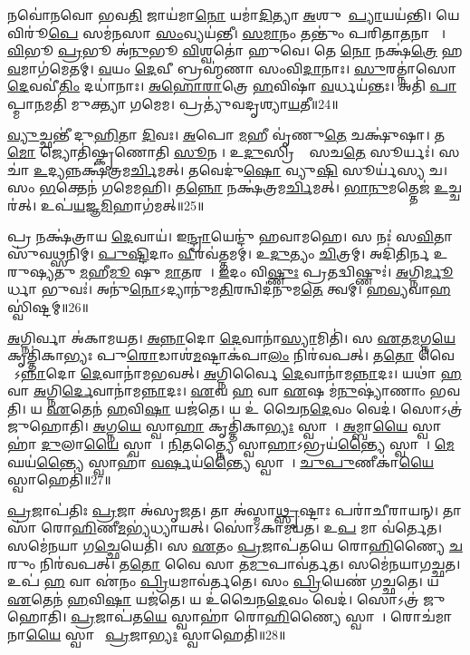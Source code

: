 𑌨𑌵𑍋॑𑌨𑌵𑍋 𑌭𑌵\ul{𑌤𑌿} 𑌜𑌾𑌯॑𑌮𑌾\ul{𑌨𑍋} 𑌯𑌮𑌾॑\ul{𑌦𑌿}𑌤𑍍𑌯𑌾 \ul{𑌅}\ul{}𑌶𑍁𑌮𑌾᳚\ul{𑌪𑍍𑌯𑌾}𑌯𑌯॑𑌨𑍍𑌤𑌿।
𑌯𑍇 𑌵𑌿𑌰𑍂॑\ul{𑌪𑍇} 𑌸𑌮॑𑌨𑌸𑌾 \ul{𑌸𑌂}𑌵𑍍𑌯𑌯॑𑌨𑍍𑌤𑍀।
\ul{𑌸}\ul{𑌮𑌾}𑌨𑌂 𑌤𑌨𑍍𑌤𑍁𑌂॑ 𑌪𑌰𑌿𑌤𑌾\ul{𑌤}𑌨𑌾 𑌤𑍇᳚।
\ul{𑌵𑌿}𑌭𑍂 \ul{𑌪𑍍𑌰}𑌭𑍂 𑌅॑\ul{𑌨𑍁}𑌭𑍂 \ul{𑌵𑌿}𑌶𑍍𑌵𑌤𑍋॑ 𑌹𑍁𑌵𑍇।
𑌤𑍇 \ul{𑌨𑍋} 𑌨𑌕𑍍𑌷॑\ul{𑌤𑍍𑌰𑍇} 𑌹\ul{𑌵}𑌮𑌾𑌗॑𑌮𑍇𑌤𑌮𑍍।
\ul{𑌵}𑌯𑌂 \ul{𑌦𑍇}𑌵𑍀 𑌬𑍍𑌰𑌹𑍍𑌮॑𑌣𑌾 𑌸𑌂𑌵𑌿\ul{𑌦𑌾}𑌨𑌾𑌃।
\ul{𑌸𑍁}𑌰𑌤𑍍𑌨𑌾॑𑌸𑍋 \ul{𑌦𑍇}𑌵𑌵𑍀॑\ul{𑌤𑌿𑌂} 𑌦𑌧𑌾॑𑌨𑌾𑌃।
\ul{𑌅}\ul{𑌹𑍋}\ul{𑌰𑌾}𑌤𑍍𑌰𑍇 \ul{𑌹}𑌵𑌿𑌷𑌾॑ \ul{𑌵}𑌰𑍍𑌧𑌯॑𑌨𑍍𑌤𑌃।
𑌅𑌤𑌿॑ \ul{𑌪𑌾}𑌪𑍍𑌮𑌾\ul{𑌨}𑌮𑌤𑌿॑ 𑌮𑍁𑌕𑍍𑌤𑍍𑌯𑌾 𑌗𑌮𑍇𑌮।
𑌪𑍍𑌰𑌤𑍍𑌯𑍁॑𑌵𑌦𑍃𑌶𑍍𑌯𑌾\ul{𑌯}𑌤𑍀॥24॥

\ul{𑌵𑍍𑌯𑍁}𑌚𑍍𑌛𑌨𑍍𑌤𑍀॑ 𑌦𑍁\ul{𑌹𑌿}𑌤𑌾 \ul{𑌦𑌿}𑌵𑌃।
\ul{𑌅}𑌪𑍋 \ul{𑌮}𑌹𑍀 𑌵𑍃॑𑌣𑍁\ul{𑌤𑍇} 𑌚𑌕𑍍𑌷𑍁॑𑌷𑌾।
𑌤\ul{𑌮𑍋} 𑌜𑍍𑌯𑍋𑌤𑌿॑𑌷𑍍𑌕𑍃𑌣𑍋𑌤𑌿 \ul{𑌸𑍂}𑌨𑌰𑍀᳚।
𑌉\ul{𑌦𑍁}𑌸𑍍𑌰𑌿𑌯𑌾𑌃᳚ 𑌸𑌚\ul{𑌤𑍇} 𑌸𑍂𑌰𑍍𑌯𑌃॑।
𑌸𑌚𑌾॑ \ul{𑌉}𑌦𑍍𑌯𑌨𑍍𑌨𑌕𑍍𑌷॑𑌤𑍍𑌰𑌮\ul{𑌰𑍍𑌚𑌿}𑌮𑌤𑍍।
𑌤𑌵𑍇𑌦𑍁॑\ul{𑌷𑍋} 𑌵𑍍𑌯𑍁\ul{𑌷𑌿} 𑌸𑍂𑌰𑍍𑌯॑𑌸𑍍𑌯 𑌚।
𑌸𑌂 \ul{𑌭}𑌕𑍍𑌤𑍇𑌨॑ 𑌗𑌮𑍇𑌮𑌹𑌿।
𑌤\ul{𑌨𑍍𑌨𑍋} 𑌨𑌕𑍍𑌷॑𑌤𑍍𑌰𑌮\ul{𑌰𑍍𑌚𑌿}𑌮𑌤𑍍।
\ul{𑌭𑌾}\ul{𑌨𑍁}𑌮𑌤𑍍𑌤𑍇𑌜॑ \ul{𑌉}𑌚𑍍𑌚𑌰॑𑌤𑍍।
𑌉𑌪॑\ul{𑌯}𑌜𑍍𑌞\ul{𑌮𑌿}𑌹𑌾𑌗॑𑌮𑌤𑍍॥25॥

𑌪𑍍𑌰 𑌨𑌕𑍍𑌷॑𑌤𑍍𑌰𑌾𑌯 \ul{𑌦𑍇}𑌵𑌾𑌯॑।
𑌇\ul{𑌨𑍍𑌦𑍍𑌰𑌾}𑌯𑍇𑌨𑍍𑌦𑍁॑ 𑌹𑌵𑌾𑌮𑌹𑍇।
𑌸 𑌨𑌃॑ 𑌸\ul{𑌵𑌿}𑌤𑌾 𑌸𑍁॑𑌵\ul{𑌥𑍍𑌸}𑌨𑌿𑌮𑍍।
\ul{𑌪𑍁}\ul{𑌷𑍍𑌟𑌿}𑌦𑌾𑌂 \ul{𑌵𑍀}𑌰𑌵॑𑌤𑍍𑌤𑌮𑌮𑍍।
𑌉\ul{𑌦𑍁}𑌤𑍍𑌯𑌂 \ul{𑌚𑌿}𑌤𑍍𑌰𑌮𑍍।
𑌅𑌦𑌿॑𑌤𑌿𑌰𑍍𑌨 𑌉𑌰𑍁𑌷𑍍𑌯𑌤𑍁 \ul{𑌮}𑌹𑍀\ul{𑌮𑍂} 𑌷𑍁 \ul{𑌮𑌾}𑌤𑌰𑌮𑍍᳚।
\ul{𑌇}𑌦𑌂 𑌵𑌿\ul{𑌷𑍍𑌣𑍁𑌃} 𑌪𑍍𑌰𑌤𑌦𑍍𑌵𑌿𑌷𑍍𑌣𑍁𑌃॑।
\ul{𑌅}𑌗𑍍𑌨𑌿\ul{𑌰𑍍𑌮𑍂}𑌰𑍍𑌧𑌾 𑌭𑍁𑌵𑌃॑।
𑌅𑌨𑍁॑\ul{𑌨𑍋}\-𑌽𑌦𑍍𑌯𑌾𑌨𑍁॑𑌮\ul{𑌤𑌿}𑌰𑌨𑍍𑌵𑌿𑌦॑𑌨𑍁𑌮\ul{𑌤𑍇} 𑌤𑍍𑌵𑌮𑍍।
\ul{𑌹}\ul{𑌵𑍍𑌯}𑌵𑌾\ul{𑌹}\ul{} 𑌸𑍍𑌵𑌿॑𑌷𑍍𑌟𑌮𑍍॥26॥\anuvakamend[\ul{𑌆}\ul{𑌯}𑌤𑍍𑌯॑𑌗\ul{𑌮}𑌥𑍍𑌸𑍍𑌵𑌿॑𑌷𑍍𑌟𑌮𑍍]

\ul{𑌅}𑌗𑍍𑌨𑌿𑌰𑍍𑌵𑌾 𑌅॑𑌕𑌾𑌮𑌯𑌤।
\ul{𑌅}\ul{𑌨𑍍𑌨𑌾}𑌦𑍋 \ul{𑌦𑍇}𑌵𑌾𑌨𑌾॑\ul{𑌸𑍍𑌯𑌾}𑌮𑌿𑌤𑌿॑।
𑌸 \ul{𑌏}𑌤\ul{𑌮}𑌗𑍍𑌨\ul{𑌯𑍇} 𑌕𑍃𑌤𑍍𑌤𑌿॑𑌕𑌾𑌭𑍍𑌯𑌃 𑌪𑍁\ul{𑌰𑍋}𑌡𑌾𑌶॑\ul{𑌮}𑌷𑍍𑌟𑌾𑌕॑𑌪𑌾\ul{𑌲𑌂} 𑌨𑌿𑌰॑𑌵𑌪𑌤𑍍।
𑌤\ul{𑌤𑍋} 𑌵𑍈 𑌸𑍋᳚\-𑌽\ul{𑌨𑍍𑌨𑌾}𑌦𑍋 \ul{𑌦𑍇}𑌵𑌾𑌨𑌾॑𑌮𑌭𑌵𑌤𑍍।
\ul{𑌅}𑌗𑍍𑌨𑌿𑌰𑍍𑌵𑍈 \ul{𑌦𑍇}𑌵𑌾𑌨𑌾॑𑌮\ul{𑌨𑍍𑌨𑌾}𑌦𑌃।
𑌯𑌥𑌾॑ \ul{𑌹} 𑌵𑌾 \ul{𑌅}𑌗𑍍𑌨𑌿\ul{𑌰𑍍𑌦𑍇}𑌵𑌾𑌨𑌾॑𑌮\ul{𑌨𑍍𑌨𑌾}𑌦𑌃।
\ul{𑌏}𑌵 \ul{𑌹} 𑌵𑌾 \ul{𑌏}𑌷 𑌮॑\ul{𑌨𑍁}𑌷𑍍𑌯𑌾॑𑌣𑌾𑌂 𑌭𑌵𑌤𑌿।
𑌯 \ul{𑌏}𑌤𑍇𑌨॑ \ul{𑌹}𑌵𑌿\ul{𑌷𑌾} 𑌯𑌜॑𑌤𑍇।
𑌯 𑌉॑ 𑌚𑍈𑌨\ul{𑌦𑍇}𑌵𑌂 𑌵𑍇𑌦॑।
𑌸𑍋𑌽𑌤𑍍𑌰॑ 𑌜𑍁𑌹𑍋𑌤𑌿।
\ul{𑌅}𑌗𑍍𑌨\ul{𑌯𑍇} 𑌸𑍍𑌵𑌾\ul{𑌹𑌾} 𑌕𑍃𑌤𑍍𑌤𑌿॑𑌕𑌾\ul{𑌭𑍍𑌯𑌃} 𑌸𑍍𑌵𑌾𑌹𑌾᳚।
\ul{𑌅}𑌮𑍍𑌬𑌾\ul{𑌯𑍈} 𑌸𑍍𑌵𑌾𑌹𑌾॑ \ul{𑌦𑍁}𑌲𑌾\ul{𑌯𑍈} 𑌸𑍍𑌵𑌾𑌹𑌾᳚।
\ul{𑌨𑌿}\ul{𑌤}𑌤𑍍𑌨𑍍𑌯𑍈 𑌸𑍍𑌵𑌾\ul{𑌹𑌾}\-𑌽𑌭𑍍𑌰𑌯॑\ul{𑌨𑍍𑌤𑍍𑌯𑍈} 𑌸𑍍𑌵𑌾𑌹𑌾᳚।
\ul{𑌮𑍇}𑌘𑌯॑\ul{𑌨𑍍𑌤𑍍𑌯𑍈} 𑌸𑍍𑌵𑌾𑌹𑌾॑ \ul{𑌵}\ul{𑌰𑍍}𑌷𑌯॑\ul{𑌨𑍍𑌤𑍍𑌯𑍈} 𑌸𑍍𑌵𑌾𑌹𑌾᳚।
\ul{𑌚𑍁}\ul{𑌪𑍁}𑌣𑍀𑌕𑌾॑\ul{𑌯𑍈} 𑌸𑍍𑌵𑌾𑌹𑍇𑌤𑌿॑॥27॥

\ul{𑌪𑍍𑌰}𑌜𑌾𑌪॑𑌤𑌿𑌃 \ul{𑌪𑍍𑌰}𑌜𑌾 𑌅॑𑌸𑍃𑌜𑌤।
𑌤𑌾 𑌅॑𑌸𑍍𑌮𑌾\ul{𑌥𑍍𑌸𑍃}𑌷𑍍𑌟𑌾𑌃 𑌪𑌰𑌾॑𑌚𑍀𑌰𑌾𑌯𑌨𑍍।
𑌤𑌾𑌸𑌾॑ 𑌰𑍋\ul{𑌹𑌿}𑌣𑍀\ul{𑌮}𑌭𑍍𑌯॑𑌧𑍍𑌯𑌾𑌯𑌤𑍍।
𑌸𑍋॑𑌽𑌕𑌾𑌮𑌯𑌤।
𑌉\ul{𑌪} 𑌮𑌾 𑌵॑𑌰𑍍𑌤𑍇𑌤।
𑌸𑌮𑍇॑𑌨𑌯𑌾 𑌗\ul{𑌚𑍍𑌛𑍇}𑌯𑍇𑌤𑌿॑।
𑌸 \ul{𑌏}𑌤𑌂 \ul{𑌪𑍍𑌰}𑌜𑌾𑌪॑𑌤𑌯𑍇 𑌰𑍋\ul{𑌹𑌿}𑌣𑍍𑌯𑍈 \ul{𑌚}𑌰𑍁𑌂 𑌨𑌿𑌰॑𑌵𑌪𑌤𑍍।
𑌤\ul{𑌤𑍋} 𑌵𑍈 𑌸𑌾 𑌤\ul{𑌮𑍁}𑌪𑌾𑌵॑𑌰𑍍𑌤𑌤।
𑌸𑌮𑍇॑𑌨𑌯𑌾𑌗𑌚𑍍𑌛𑌤।
𑌉𑌪॑ \ul{𑌹} 𑌵𑌾 𑌏॑𑌨𑌂 \ul{𑌪𑍍𑌰𑌿}𑌯𑌮𑌾𑌵॑𑌰𑍍𑌤𑌤𑍇।
𑌸𑌂 \ul{𑌪𑍍𑌰𑌿}𑌯𑍇𑌣॑ 𑌗𑌚𑍍𑌛𑌤𑍇।
𑌯 \ul{𑌏}𑌤𑍇𑌨॑ \ul{𑌹}𑌵𑌿\ul{𑌷𑌾} 𑌯𑌜॑𑌤𑍇।
𑌯 𑌉॑𑌚𑍈𑌨\ul{𑌦𑍇}𑌵𑌂 𑌵𑍇𑌦॑।
𑌸𑍋𑌽𑌤𑍍𑌰॑ 𑌜𑍁𑌹𑍋𑌤𑌿।
\ul{𑌪𑍍𑌰}𑌜𑌾𑌪॑𑌤\ul{𑌯𑍇} 𑌸𑍍𑌵𑌾𑌹𑌾॑ 𑌰𑍋\ul{𑌹𑌿}𑌣𑍍𑌯𑍈 𑌸𑍍𑌵𑌾𑌹𑌾᳚।
𑌰𑍋𑌚॑𑌮𑌾𑌨𑌾\ul{𑌯𑍈} 𑌸𑍍𑌵𑌾𑌹𑌾᳚ \ul{𑌪𑍍𑌰}𑌜𑌾\ul{𑌭𑍍𑌯𑌃} 𑌸𑍍𑌵𑌾𑌹𑍇𑌤𑌿॑॥28॥

